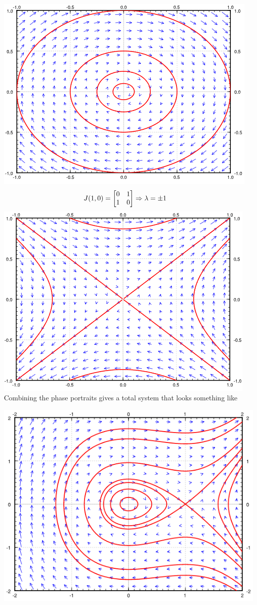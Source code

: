 \documentclass[11pt, fleqn]{article}
\begin{document}
\includegraphics[scale=0.8]{ODEPictures/phasePortrait6.png}
\begin{align*}
    &J(1,0)=\matrixx{0&1\\1&0}\Ra \lambda=\pm 1
\end{align*}
\includegraphics[scale=0.8]{ODEPictures/phasePortrait7.png}\\
Combining the phase portraits gives a total system that looks something like\\
\centerline{\includegraphics[scale=0.9]{ODEPictures/phasePortrait8.png}}
\end{document}
